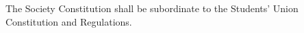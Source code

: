  The Society Constitution shall be subordinate to the Students' Union Constitution and Regulations.\ \\